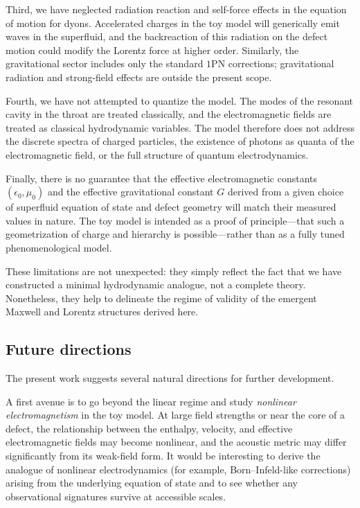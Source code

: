 \documentclass[11pt]{article}
\begin{document}
Third, we have neglected radiation reaction and self-force effects in the equation of motion for dyons.  Accelerated charges in the toy model will generically emit waves in the superfluid, and the backreaction of this radiation on the defect motion could modify the Lorentz force at higher order.  Similarly, the gravitational sector includes only the standard $1$PN corrections; gravitational radiation and strong-field effects are outside the present scope.

Fourth, we have not attempted to quantize the model.  The modes of the resonant cavity in the throat are treated classically, and the electromagnetic fields are treated as classical hydrodynamic variables.  The model therefore does not address the discrete spectra of charged particles, the existence of photons as quanta of the electromagnetic field, or the full structure of quantum electrodynamics.

Finally, there is no guarantee that the effective electromagnetic constants $(\epsilon_0,\mu_0)$ and the effective gravitational constant $G$ derived from a given choice of superfluid equation of state and defect geometry will match their measured values in nature.  The toy model is intended as a proof of principle---that such a geometrization of charge and hierarchy is possible---rather than as a fully tuned phenomenological model.

These limitations are not unexpected: they simply reflect the fact that we have constructed a minimal hydrodynamic analogue, not a complete theory.  Nonetheless, they help to delineate the regime of validity of the emergent Maxwell and Lorentz structures derived here.

\subsection{Future directions}

The present work suggests several natural directions for further development.

A first avenue is to go beyond the linear regime and study \emph{nonlinear electromagnetism} in the toy model.  At large field strengths or near the core of a defect, the relationship between the enthalpy, velocity, and effective electromagnetic fields may become nonlinear, and the acoustic metric may differ significantly from its weak-field form.  It would be interesting to derive the analogue of nonlinear electrodynamics (for example, Born--Infeld-like corrections) arising from the underlying equation of state and to see whether any observational signatures survive at accessible scales.
\end{document}
